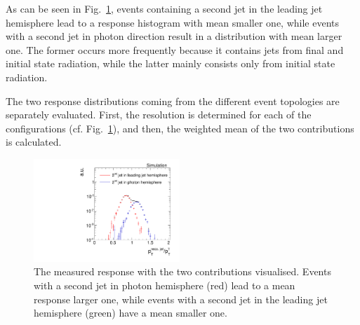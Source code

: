 As can be seen in Fig.~\ref{fig:fullResponseAndContributions}, events containing a second jet in the leading jet hemisphere lead to a response histogram with mean smaller one, while events with a second jet in photon direction result in a distribution with mean larger one. 
The former occurs more frequently because it contains jets from final and initial state radiation, while the latter mainly consists only from initial state radiation.

The two response distributions coming from the different event topologies are separately evaluated. First, the resolution is determined for each of the configurations 
(cf. Fig.~\ref{fig:fullResponseAndContributions}), and then, the weighted mean of the two contributions is calculated.\\
\begin{figure}[!t]
  \centering
      \includegraphics[width=0.49\textwidth]{figures/resolution/methodology/fullResponseAndContributions_6_alpha_bin.pdf}
  \caption{The measured response with the two contributions visualised. Events with a second jet in photon hemisphere (red) lead to a mean response larger one, while events with a
           second jet in the leading jet hemisphere (green) have a mean smaller one.}  
  \label{fig:fullResponseAndContributions}
\end{figure}



